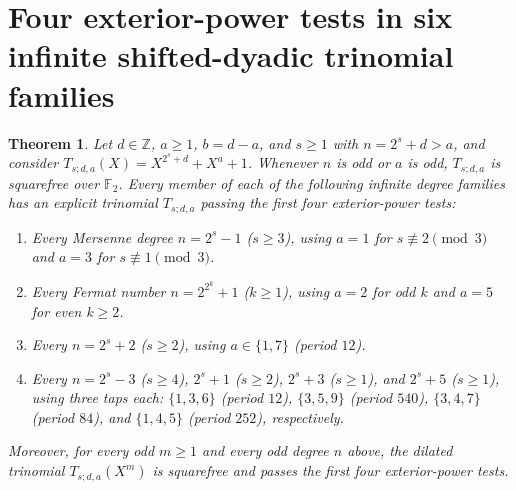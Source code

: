 \documentclass[11pt]{article}
\newtheorem{theorem}{Theorem}
\newcommand{\F}{\mathbb F_2}
\begin{document}
\section{Four exterior-power tests in six infinite shifted-dyadic trinomial families}
\label{sec:shifted-trinomial-quartets}
\begin{theorem}\label{thm:shifted-trinomial-quartets}
Let \(d\in\mathbb Z\), \(a\ge1\), \(b=d-a\), and \(s\ge1\) with
\(n=2^s+d>a\), and consider \(T_{s;d,a}(X)=X^{2^s+d}+X^a+1\). Whenever \(n\) is
odd or \(a\) is odd, \(T_{s;d,a}\) is squarefree over \(\F\). Every member of
each of the following infinite degree families has an explicit trinomial
\(T_{s;d,a}\) passing the first four exterior-power tests:
\begin{enumerate}
\item Every Mersenne degree \(n=2^s-1\) (\(s\ge3\)), using \(a=1\) for
\(s\not\equiv2\pmod3\) and \(a=3\) for \(s\not\equiv1\pmod3\).
\item Every Fermat number \(n=2^{2^k}+1\) (\(k\ge1\)), using \(a=2\) for odd
\(k\) and \(a=5\) for even \(k\ge2\).
\item Every \(n=2^s+2\) (\(s\ge2\)), using \(a\in\{1,7\}\) (period \(12\)).
\item Every \(n=2^s-3\) (\(s\ge4\)), \(2^s+1\) (\(s\ge2\)), \(2^s+3\)
(\(s\ge1\)), and \(2^s+5\) (\(s\ge1\)), using three taps each:
\(\{1,3,6\}\) (period \(12\)), \(\{3,5,9\}\) (period \(540\)), \(\{3,4,7\}\)
(period \(84\)), and \(\{1,4,5\}\) (period \(252\)), respectively.
\end{enumerate}
Moreover, for every odd \(m\ge1\) and every odd degree \(n\) above, the dilated
trinomial \(T_{s;d,a}(X^m)\) is squarefree and passes the first four
exterior-power tests.
\end{theorem}
\end{document}
